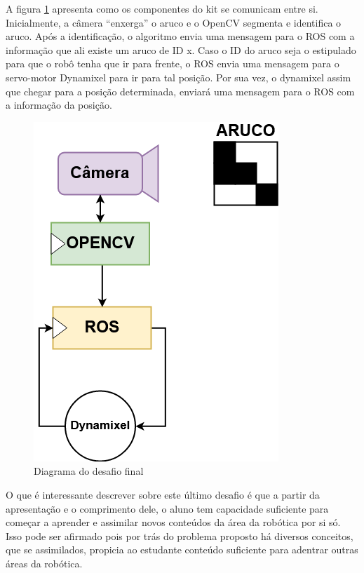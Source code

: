 A figura \ref{fig:def_fin} apresenta como os componentes do kit se comunicam entre si. Inicialmente, a câmera “enxerga” o aruco e o OpenCV segmenta e identifica o aruco. Após a identificação, o algoritmo envia uma mensagem para o ROS com a informação que ali existe um aruco de ID x. Caso o ID do aruco seja o estipulado para que o robô tenha que ir para frente, o ROS envia uma mensagem para o servo-motor Dynamixel para ir para tal posição. Por sua vez, o dynamixel assim que chegar para a posição determinada, enviará uma mensagem para o ROS com a informação da posição.

\begin{figure}[H]
	\centering
	\includegraphics[scale=0.75, angle=0]{Figures/desafio_final.png}
	\caption{Diagrama do desafio final}
	\label{fig:def_fin}
\end{figure}

O que é interessante descrever sobre este último desafio é que a partir da apresentação e o comprimento dele, o aluno tem capacidade suficiente para começar a aprender e assimilar novos conteúdos da área da robótica por si só. Isso pode ser afirmado pois por trás do problema proposto há diversos conceitos, que se assimilados, propicia ao estudante conteúdo suficiente para adentrar outras áreas da robótica. 
